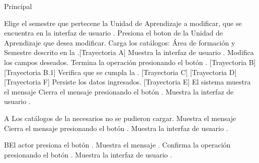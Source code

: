 \begin{UCtrayectoria}{Principal}

	\UCpaso[\UCactor] Elige el semestre que pertecene la Unidad de Aprendizaje a modificar, que se encuentra en la interfaz de usuario .
	\UCpaso[\UCactor] Presiona el boton  de la Unidad de Aprendizaje que desea modificar.
	\UCpaso Carga los catálogos: Área de formación y Semestre descrito en la .[Trayectoria A]
	\UCpaso Muestra la interfaz de usuario .
	\UCpaso[\UCactor] Modifica los campos deseados.
	\UCpaso[\UCactor] Termina la operación presionando el botón . [Trayectoria B] [Trayectoria B.1]
	\UCpaso Verifica que se cumpla la . [Trayectoria C] [Trayectoria D] [Trayectoria F]
	\UCpaso Persiste los datos ingresados. [Trayectoria E]
	\UCpaso El sistema muestra el mensaje 
	\UCpaso[\UCactor] Cierra el mensaje presionando el botón .
	\UCpaso Muestra la interfaz de usuario  .
\end{UCtrayectoria}

\begin{UCtrayectoriaA}{A}{ Los catálogos de la  necesarios no se pudieron cargar.}
	\UCpaso Muestra el mensaje 
	\UCpaso[\UCactor] Cierra el mensaje presionando el botón .
	\UCpaso Muestra la interfaz de usuario .
\end{UCtrayectoriaA}

\begin{UCtrayectoriaA}{B}{El actor presiona el botón .}
	\UCpaso Muestra el mensaje .
	\UCpaso[\UCactor] Confirma la operación presionando el botón .
	\UCpaso Muestra la interfaz de usuario .
\end{UCtrayectoriaA}


